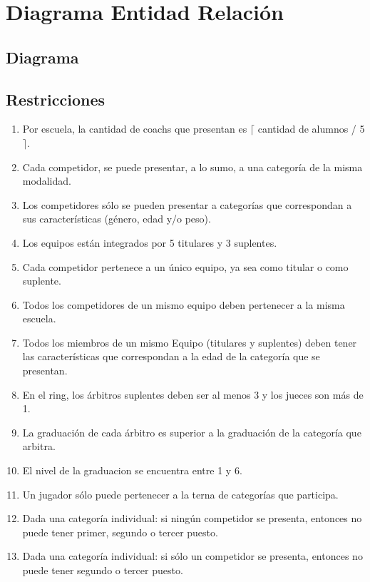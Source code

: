 \section{Diagrama Entidad Relación}
\subsection{Diagrama}
\subsection{Restricciones}

\begin{enumerate}
\item Por escuela, la cantidad de coachs que presentan es $\lceil$ cantidad de alumnos / 5 $\rceil$.
\item Cada competidor, se puede presentar, a lo sumo, a una categoría de la misma modalidad.
\item Los competidores s\'olo se pueden presentar a categor\'ias que correspondan a sus caracter\'isticas (g\'enero, edad y/o peso).
\item Los equipos están integrados por 5 titulares y 3 suplentes.
\item Cada competidor pertenece a un único equipo, ya sea como titular o como suplente.
\item Todos los competidores de un mismo equipo deben pertenecer a la misma escuela.
\item Todos los miembros de un mismo Equipo (titulares y suplentes) deben tener las caracter\'isticas que correspondan a la edad de la categor\'ia que se presentan.
\item En el ring, los \'arbitros suplentes deben ser al menos 3 y los jueces son m\'as de 1.
\item La graduaci\'on de cada \'arbitro es superior a la graduaci\'on de la categor\'ia que arbitra.
\item El nivel de la graduacion se encuentra entre 1 y 6.
\item Un jugador s\'olo puede pertenecer a la terna de categor\'ias que participa.
\item Dada una categor\'ia individual: si ning\'un competidor se presenta, entonces no puede tener primer, segundo o tercer puesto.
\item Dada una categor\'ia individual: si s\'olo un competidor se presenta, entonces no puede tener segundo o tercer puesto.

\end{enumerate}
